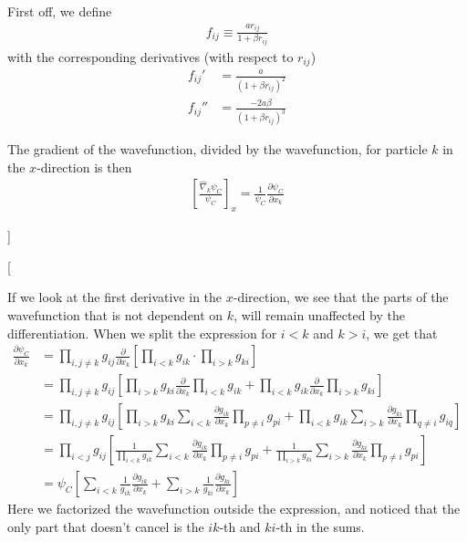\documentclass[twocolumns, a4paper,11pt,fleqn]{extarticle}
\newcommand{\eq}[1]{{\small\begin{align*}#1\end{align*}}}
\newcommand{\equ}[1]{{\small\begin{align}#1\end{align}}}
\newcommand{\op}[1]{\hat{#1}}
\begin{document}
{First off, we define
\eq{
  f_{ij} \equiv \frac{ar_{ij}}{1+\beta r_{ij}}
}
with the corresponding derivatives (with respect to $r_{ij}$)
\eq{
  f_{ij}' &= \frac{a}{(1+\beta r_{ij})^2}\\
  f_{ij}'' &= \frac{-2a\beta}{(1+\beta r_{ij})^3}
}

The gradient of the wavefunction, 
divided by the wavefunction, for particle $k$ in the $x$-direction is then
\eq{
  \left[\frac{\op\nabla_k\psi_C}{\psi_C}\right]_x 
  =\frac{1}{\psi_C}\frac{\partial\psi_C}{\partial x_k}
}
}]

\twocolumn[{%
If we look at the first derivative in the $x$-direction, 
we see that the parts of the wavefunction that is not dependent on $k$, 
will remain unaffected by the 
differentiation.
When we split the expression for $i<k$ and $k>i$, we get that
\equ{
  \frac{\partial\psi_C}{\partial x_k}&=\prod_{i,j\neq k} g_{ij}
    \frac{\partial}{\partial x_k}
    \left[ \prod_{i<k} g_{ik} \cdot \prod_{i>k} g_{ki} \right]\nonumber\\
    &=\prod_{i,j\neq k} g_{ij}
      \left[\prod_{i>k} g_{ki}\frac{\partial}{\partial x_k}\prod_{i<k} g_{ik} 
      + \prod_{i<k} g_{ik} \frac{\partial}{\partial x_k}\prod_{i>k} g_{ki} \right]
      \nonumber\\
    &=\prod_{i,j\neq k} g_{ij}
      \left[\prod_{i>k} g_{ki} \sum_{i<k} \frac{\partial g_{ik}}{\partial x_k} \prod_{p\neq i} g_{pi}
      + \prod_{i<k} g_{ik} \sum_{i>k} \frac{\partial g_{ki}}{\partial x_k} \prod_{q\neq i} g_{iq} \right]
      \nonumber\\
    &=\prod_{i<j} g_{ij}
      \left[\frac{1}{\prod_{i<k} g_{ik}} \sum_{i<k} 
      \frac{\partial g_{ik}}{\partial x_k} \prod_{p\neq i} g_{pi}
      + \frac{1}{\prod_{i>k} g_{ki}} \sum_{i>k} 
      \frac{\partial g_{ki}}{\partial x_k} \prod_{p\neq i} g_{pi} \right]
      \nonumber\\
    &=\psi_C
      \left[\sum_{i<k} \frac{1}{g_{ik}} \frac{\partial g_{ik}}{\partial x_k}
      +\sum_{i>k} \frac{1}{g_{ki}} \frac{\partial g_{ki}}{\partial x_k} \right]
      \label{DpsiC}
}
Here we factorized the wavefunction outside the expression, 
and noticed that the only part that doesn't cancel is the $ik$-th and $ki$-th
in the sums.

}
\end{document}

